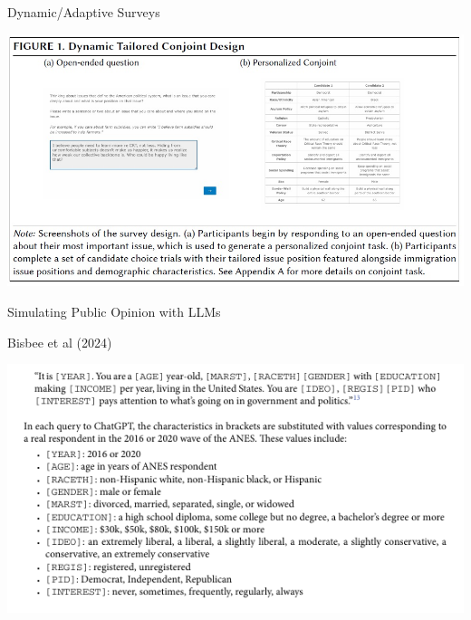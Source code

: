 \documentclass[10pt,aspectratio=169]{beamer}
\newcommand{\nblue}[1]{{\color{ceruleanblue} {#1}}}
\begin{document}
\begin{frame}{Dynamic/Adaptive Surveys}

\nblue{\citet{velez2024confronting}}

\begin{center}
\includegraphics[width=.6\textwidth]{figures/velez_conjoint.jpg}
\end{center}

\end{frame}



























\begin{frame}{Simulating Public Opinion with LLMs}

	\nblue{Bisbee et al (2024)}
	\begin{center}
		\includegraphics[width=.7\textwidth]{figures/bisbee_prompt.png}
	\end{center}
\end{frame}
\end{document}
